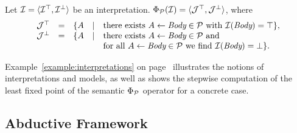 Let $\mathcal{I} = \langle \mathcal{I}^\top,\mathcal{I}^\bot
\rangle$ be an interpretation. $\Phi_{\mathcal{P}} (\mathcal{I}) =
\langle \mathcal{J}^\top,\mathcal{J}^\bot\rangle$, where 
\[
\begin{array}{lclcl}
\mathcal{J}^\top & = & \{ A & \mid & \mbox{there exists }  A \leftarrow \mbox{\em Body} \in \mathcal{P} \mbox{ with } \mathcal{I}(\mbox{\em Body}) = \top \},\\
\mathcal{J}^\bot & = & \{ A & \mid & \mbox{there exists }  A \leftarrow \mbox{\em Body} \in \mathcal{P} \mbox{ and} \\
	  &    &       &         & \mbox{for all }  A \leftarrow \mbox{\em Body} \in \mathcal{P} \mbox{ we find }  \mathcal{I}(\mbox{\em Body}) = \bot \}.
\end{array}
\]

Example~\ref{example:interpretations} on page~\pageref{example:interpretations} illustrates the notions of interpretations and models, as well as shows the stepwise computation of the least fixed point of the semantic $\Phi_{\mathcal{P}}$ operator for a concrete case.

\subsection{Abductive Framework}

